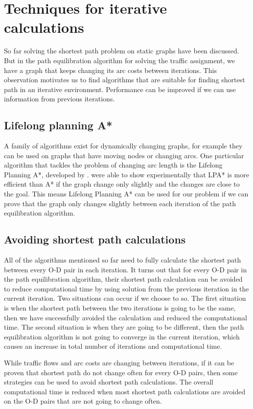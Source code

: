 \section{Techniques for iterative calculations}
So far solving the shortest path problem on static graphs have been discussed.
But in the path equilibration algorithm for solving the traffic assignment,
we have a graph that keeps changing its arc costs between iterations.
This observation motivates us to find algorithms that are suitable for finding shortest path in an iterative environment.
Performance can be improved if we can use information from previous iterations.

\subsection{Lifelong planning A*}
A family of algorithms exist for dynamically changing graphs,
for example they can be used on graphs that have moving nodes or changing arcs.
One particular algorithm that tackles the problem of changing arc length is the Lifelong Planning A*, developed by \citet{LPA*}.
\citet{LPA*} were able to show experimentally that LPA* is more efficient than A* if the graph change only slightly and the changes are close to the goal.
This means Lifelong Planning A* can be used for our problem if we can prove that the graph only changes slightly between each iteration of the path equilibration algorithm.

\subsection{Avoiding shortest path calculations} \label{section:avoid}
All of the algorithms mentioned so far need to fully calculate the shortest path between every O-D pair in each iteration.
It turns out that for every O-D pair in the path equilibration algorithm,
their shortest path calculation can be avoided to reduce computational time by using solution from the previous iteration in the current iteration.
Two situations can occur if we choose to so.
The first situation is when the shortest path between the two iterations is going to be the same,
then we have successfully avoided the calculation and reduced the computational time.
The second situation is when they are going to be different,
then the path equilibration algorithm is not going to converge in the current iteration,
which causes an increase in total number of iterations and computational time.

While traffic flows and arc costs are changing between iterations,
if it can be proven that shortest path do not change often for every O-D pairs,
then some strategies can be used to avoid shortest path calculations.
The overall computational time is reduced when most shortest path calculations are avoided on the O-D pairs that are not going to change often.

